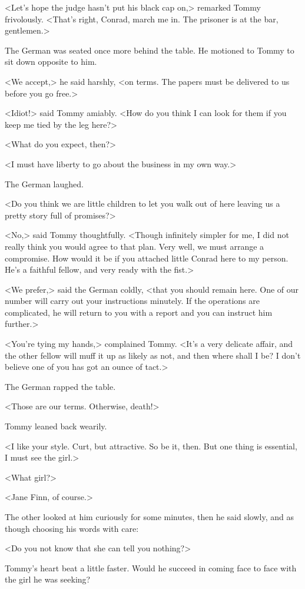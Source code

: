 <Let's hope the judge hasn't put his black cap on,> remarked Tommy frivolously. <That's right, Conrad, march me in. The prisoner is at the bar, gentlemen.>

The German was seated once more behind the table. He motioned to Tommy to sit down opposite to him.

<We accept,> he said harshly, <on terms. The papers must be delivered to us before you go free.>

<Idiot!> said Tommy amiably. <How do you think I can look for them if you keep me tied by the leg here?>

<What do you expect, then?>

<I must have liberty to go about the business in my own way.>

The German laughed.

<Do you think we are little children to let you walk out of here leaving us a pretty story full of promises?>

<No,> said Tommy thoughtfully. <Though infinitely simpler for me, I did not really think you would agree to that plan. Very well, we must arrange a compromise. How would it be if you attached little Conrad here to my person. He's a faithful fellow, and very ready with the fist.>

<We prefer,> said the German coldly, <that you should remain here. One of our number will carry out your instructions minutely. If the operations are complicated, he will return to you with a report and you can instruct him further.>

<You're tying my hands,> complained Tommy. <It's a very delicate affair, and the other fellow will muff it up as likely as not, and then where shall I be? I don't believe one of you has got an ounce of tact.>

The German rapped the table.

<Those are our terms. Otherwise, death!>

Tommy leaned back wearily.

<I like your style. Curt, but attractive. So be it, then. But one thing is essential, I must see the girl.>

<What girl?>

<Jane Finn, of course.>

The other looked at him curiously for some minutes, then he said slowly, and as though choosing his words with care:

<Do you not know that she can tell you nothing?>

Tommy's heart beat a little faster. Would he succeed in coming face to face with the girl he was seeking?

